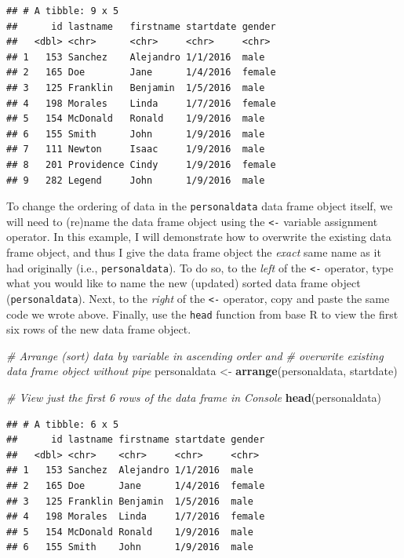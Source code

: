 \documentclass[]{book}
\newenvironment{Shaded}{\begin{snugshade}}{\end{snugshade}}
\newcommand{\KeywordTok}[1]{\textcolor[rgb]{0.13,0.29,0.53}{\textbf{#1}}}
\newcommand{\StringTok}[1]{\textcolor[rgb]{0.31,0.60,0.02}{#1}}
\newcommand{\CommentTok}[1]{\textcolor[rgb]{0.56,0.35,0.01}{\textit{#1}}}
\newcommand{\NormalTok}[1]{#1}
\begin{document}
\begin{verbatim}
## # A tibble: 9 x 5
##      id lastname   firstname startdate gender
##   <dbl> <chr>      <chr>     <chr>     <chr> 
## 1   153 Sanchez    Alejandro 1/1/2016  male  
## 2   165 Doe        Jane      1/4/2016  female
## 3   125 Franklin   Benjamin  1/5/2016  male  
## 4   198 Morales    Linda     1/7/2016  female
## 5   154 McDonald   Ronald    1/9/2016  male  
## 6   155 Smith      John      1/9/2016  male  
## 7   111 Newton     Isaac     1/9/2016  male  
## 8   201 Providence Cindy     1/9/2016  female
## 9   282 Legend     John      1/9/2016  male
\end{verbatim}

To change the ordering of data in the \texttt{personaldata} data frame
object itself, we will need to (re)name the data frame object using the
\texttt{\textless{}-} variable assignment operator. In this example, I
will demonstrate how to overwrite the existing data frame object, and
thus I give the data frame object the \emph{exact} same name as it had
originally (i.e., \texttt{personaldata}). To do so, to the \emph{left}
of the \texttt{\textless{}-} operator, type what you would like to name
the new (updated) sorted data frame object (\texttt{personaldata}).
Next, to the \emph{right} of the \texttt{\textless{}-} operator, copy
and paste the same code we wrote above. Finally, use the \texttt{head}
function from base R to view the first six rows of the new data frame
object.

\begin{Shaded}
\begin{Highlighting}[]
\CommentTok{# Arrange (sort) data by variable in ascending order and }
\CommentTok{# overwrite existing data frame object without pipe}
\NormalTok{personaldata <-}\StringTok{ }\KeywordTok{arrange}\NormalTok{(personaldata, startdate)}

\CommentTok{# View just the first 6 rows of the data frame in Console}
\KeywordTok{head}\NormalTok{(personaldata)}
\end{Highlighting}
\end{Shaded}

\begin{verbatim}
## # A tibble: 6 x 5
##      id lastname firstname startdate gender
##   <dbl> <chr>    <chr>     <chr>     <chr> 
## 1   153 Sanchez  Alejandro 1/1/2016  male  
## 2   165 Doe      Jane      1/4/2016  female
## 3   125 Franklin Benjamin  1/5/2016  male  
## 4   198 Morales  Linda     1/7/2016  female
## 5   154 McDonald Ronald    1/9/2016  male  
## 6   155 Smith    John      1/9/2016  male
\end{verbatim}
\end{document}
